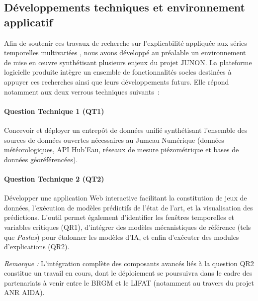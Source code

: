 \bigskip
\subsection*{Développements techniques et environnement applicatif}

Afin de soutenir ces travaux de recherche sur l'explicabilité appliquée aux séries temporelles multivariées \cite{petropoulos2022forecasting, kong2025deep}, nous avons développé au préalable un environnement de mise en œuvre synthétisant plusieurs enjeux du projet JUNON. La plateforme logicielle produite intègre un ensemble de fonctionnalités socles destinées à appuyer ces recherches ainsi que leurs développements futurs. Elle répond notamment aux deux verrous techniques suivants~:

\paragraph{Question Technique 1 (QT1)}
Concevoir et déployer un entrepôt de données unifié synthétisant l'ensemble des sources de données ouvertes nécessaires au Jumeau Numérique (données météorologiques, API Hub'Eau, réseaux de mesure piézométrique et bases de données géoréférencées).

\paragraph{Question Technique 2 (QT2)}
Développer une application Web interactive facilitant la constitution de jeux de données, l'exécution de modèles prédictifs de l'état de l'art, et la visualisation des prédictions. L'outil permet également d'identifier les fenêtres temporelles et variables critiques (QR1), d'intégrer des modèles mécanistiques de référence (tels que \textit{Pastas}) pour étalonner les modèles d'IA, et enfin d'exécuter des modules d'explications (QR2).

\textit{Remarque :} L'intégration complète des composants avancés liés à la question QR2 constitue un travail en cours, dont le déploiement se poursuivra dans le cadre des partenariats à venir entre le BRGM et le LIFAT (notamment au travers du projet ANR AIDA).

